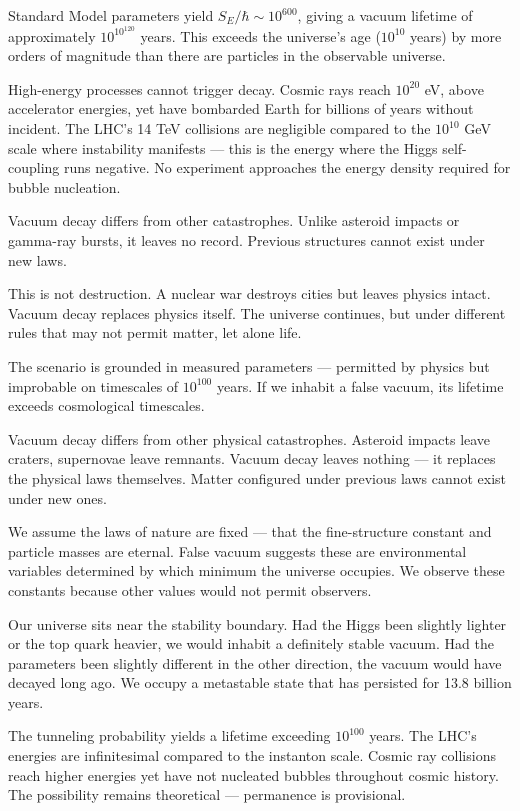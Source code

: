 Standard Model parameters yield $S_E/\hbar \sim 10^{600}$, giving a vacuum lifetime of approximately $10^{10^{120}}$ years. This exceeds the universe's age ($10^{10}$ years) by more orders of magnitude than there are particles in the observable universe.

High-energy processes cannot trigger decay. Cosmic rays reach $10^{20}$ eV, above accelerator energies, yet have bombarded Earth for billions of years without incident. The LHC's 14 TeV collisions are negligible compared to the $10^{10}$ GeV scale where instability manifests — this is the energy where the Higgs self-coupling runs negative. No experiment approaches the energy density required for bubble nucleation.

Vacuum decay differs from other catastrophes. Unlike asteroid impacts or gamma-ray bursts, it leaves no record. Previous structures cannot exist under new laws.

This is not destruction. A nuclear war destroys cities but leaves physics intact. Vacuum decay replaces physics itself. The universe continues, but under different rules that may not permit matter, let alone life.

The scenario is grounded in measured parameters — permitted by physics but improbable on timescales of $10^{100}$ years. If we inhabit a false vacuum, its lifetime exceeds cosmological timescales.

\begin{commentary}
Vacuum decay differs from other physical catastrophes. Asteroid impacts leave craters, supernovae leave remnants. Vacuum decay leaves nothing — it replaces the physical laws themselves. Matter configured under previous laws cannot exist under new ones.

We assume the laws of nature are fixed — that the fine-structure constant and particle masses are eternal. False vacuum suggests these are environmental variables determined by which minimum the universe occupies. We observe these constants because other values would not permit observers.

Our universe sits near the stability boundary. Had the Higgs been slightly lighter or the top quark heavier, we would inhabit a definitely stable vacuum. Had the parameters been slightly different in the other direction, the vacuum would have decayed long ago. We occupy a metastable state that has persisted for 13.8 billion years.

The tunneling probability yields a lifetime exceeding $10^{100}$ years. The LHC's energies are infinitesimal compared to the instanton scale. Cosmic ray collisions reach higher energies yet have not nucleated bubbles throughout cosmic history. The possibility remains theoretical — permanence is provisional.
\end{commentary}

